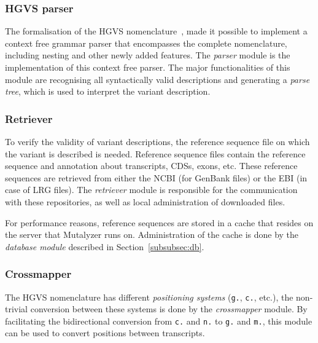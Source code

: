 \documentclass{article}
\begin{document}
\subsubsection{HGVS parser} \label{subsubsec:parser}
The formalisation of the HGVS nomenclature~\cite{hgvs_bnf}, made it possible to
implement a context free grammar parser that encompasses the complete
nomenclature, including nesting and other newly added features. The
\emph{parser} module is the implementation of this context free parser. The
major functionalities of this module are recognising all syntactically valid
descriptions and generating a \emph{parse tree}, which is used to interpret the
variant description.

\subsubsection{Retriever} \label{subsubsec:retriever}
To verify the validity of variant descriptions, the reference sequence file on
which the variant is described is needed. Reference sequence files contain the
reference sequence and annotation about transcripts, CDSs, exons, etc. These
reference sequences are retrieved from either the NCBI (for GenBank files) or
the EBI (in case of LRG files). The \emph{retriever} module is responsible for
the communication with these repositories, as well as local administration of
downloaded files.

For performance reasons, reference sequences are stored in a cache that resides
on the server that Mutalyzer runs on. Administration of the cache is done by
the \emph{database module} described in Section~\ref{subsubsec:db}.

\subsubsection{Cross\-mapper} \label{subsubsec:crossmap}
The HGVS nomenclature has different \emph{positioning systems} (\texttt{g.},
\texttt{c.}, etc.), the non-trivial conversion between these systems is done by
the \emph{cross\-mapper} module. By facilitating the bidirectional conversion
from \texttt{c.} and \texttt{n.} to \texttt{g.} and \texttt{m.}, this module
can be used to convert positions between transcripts.
\end{document}
